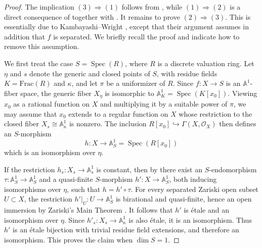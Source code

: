 \documentclass[10pt]{amsart}
\renewcommand{\AA}{\mathbb{A}}
\newcommand{\Spec}{\operatorname{Spec}}
\numberwithin{equation}{section} %
\theoremstyle{plain}
\theoremstyle{definition}
\theoremstyle{remark}
\begin{document}
\begin{proof}
The implication $(3)\Rightarrow (1)$ follows from , while $(1)\Rightarrow (2)$ is a direct consequence of  together with . It remains to prove $(2)\Rightarrow (3)$. This is essentially due to Kambayashi–Wright \cite{KW85}, except that their argument assumes in addition that $f$ is separated. We briefly recall the proof and indicate how to remove this assumption.
\medskip

We first treat the case $S=\Spec(R)$, where $R$ is a discrete valuation ring. Let $\eta$ and $s$ denote the generic and closed points of $S$, with residue fields $K=\mathrm{Frac}(R)$ and $\kappa$, and let $\pi$ be a uniformizer of $R$. Since $f:X\to S$ is an $\AA^1$-fiber space, the generic fiber $X_\eta$ is isomorphic to $\AA^1_K=\Spec(K[x_0])$. Viewing $x_0$ as a rational function on $X$ and multiplying it by a suitable power of $\pi$, we may assume that $x_0$ extends to a regular function on $X$ whose restriction to the closed fiber $X_s\cong \AA^1_\kappa$ is nonzero. The inclusion $R[x_0]\hookrightarrow \Gamma(X,\mathcal{O}_X)$ then defines an $S$-morphism
\[
h:X\to \AA^1_S=\Spec(R[x_0])
\]
which is an isomorphism over $\eta$.
\medskip

If the restriction $h_s:X_s\to \AA^1_s$ is constant, then by \cite[Proposition~1.4]{KW85} there exist an $S$-endomorphism $\tau:\AA^1_S\to \AA^1_S$ and a quasi-finite $S$-morphism $h':X\to \AA^1_S$, both inducing isomorphisms over $\eta$, such that $h=h'\circ \tau$. For every separated Zariski open subset $U\subset X$, the restriction $h'|_U:U\to \AA^1_S$ is birational and quasi-finite, hence an open immersion by Zariski’s Main Theorem \cite[Corollaire~8.12.10]{EGAIV-Grothendieck1966}. It follows that $h'$ is \'etale and an isomorphism over $\eta$. Since $h'_s:X_s\to \AA^1_\kappa$ is also \'etale, it is an isomorphism. Thus $h'$ is an \'etale bijection with trivial residue field extensions, and therefore an isomorphism. This proves the claim when $\dim S=1$.
\medskip


\end{proof}
\end{document}
